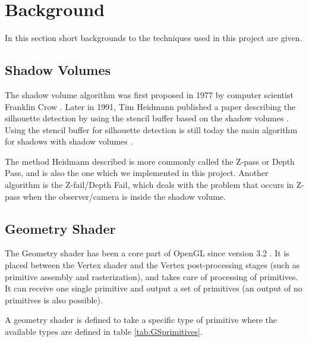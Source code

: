 \documentclass[a4paper, 12pt]{article}
\begin{document}
\section{Background}
In this section short backgrounds to the techniques used in this project are given.
\subsection{Shadow Volumes}
The shadow volume algorithm was first proposed in 1977 by computer scientist Franklin Crow \cite{CROW77}. Later in 1991, Tim Heidmann published a paper describing the silhouette detection by using the stencil buffer based on the shadow volumes \cite{HEIDMANN91}. Using the stencil buffer for silhouette detection is still today the main algorithm for shadows with shadow volumes \cite{KOLIVAND13}. 

The method Heidmann described is more commonly called the Z-pass or Depth Pass, and is also the one which we implemented in this project. Another algorithm is the Z-fail/Depth Fail, which deals with the problem that occurs in Z-pass when the observer/camera is inside the shadow volume. 
\subsection{Geometry Shader}
The Geometry shader has been a core part of OpenGL since version 3.2 \cite{GEOM}. It is placed between the Vertex shader and the Vertex post-processing stages (such as primitive assembly and rasterization), and takes care of processing of primitives. It can receive one single primitive and output a set of primitives (an output of no primitives is also possible).

A geometry shader is defined to take a specific type of primitive where the available types are defined in table \ref{tab:GSprimitives}.
\end{document}

